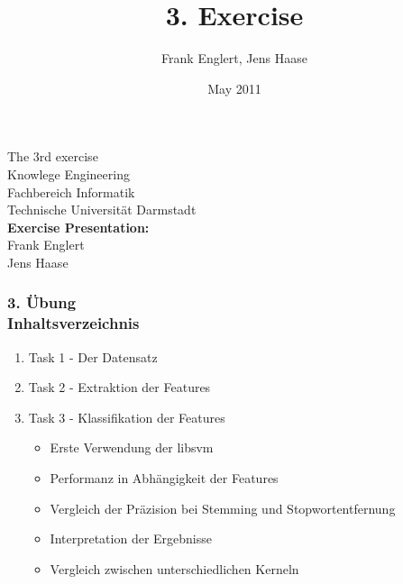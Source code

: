 \documentclass[accentcolor=tud1b,colorbacktitle,inverttitle,landscape,presentation,t]{tudbeamer}
\newcommand{\myframetitle}[2]{\frametitle{#1 \\[.2cm] \small #2}}
\begin{document}
\title[MGA]{\large 3. Exercise}

\author{Frank Englert, Jens Haase}


\date{May 2011}

\begin{titleframe}
\begin{center}
\color{tudtextaccent} \large The 3rd exercise\\[.5cm]
\normalcolor \normalsize Knowlege Engineering \\
Fachbereich Informatik \\
Technische Universität Darmstadt\\[.5cm]

\textbf{Exercise Presentation:}\\
Frank Englert\\
Jens Haase
\end{center}

\end{titleframe} 
 
\begin{frame}[c]
	\myframetitle{3. Übung}{Inhaltsverzeichnis}
\begin{enumerate}
  \item Task 1 - Der Datensatz
  \item Task 2 - Extraktion der Features 
  \item Task 3 - Klassifikation der Features
  \begin{itemize}
  \item Erste Verwendung der libsvm
  \item Performanz in Abhängigkeit der Features
  \item Vergleich der Präzision bei Stemming und
	Stopwortentfernung
	\item Interpretation der Ergebnisse
	\item Vergleich zwischen unterschiedlichen Kerneln
\end{itemize}
\end{enumerate}
\end{frame}




\end{document}
